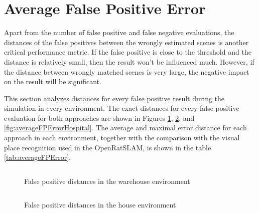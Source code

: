 \section{Average False Positive Error}\label{section:averageError}

Apart from the number of false positive and false negative evaluations, the distances of the false positives between the wrongly estimated scenes is another critical performance metric. If the false positive is close to the threshold and the distance is relatively small, then the result won't be influenced much. However, if the distance between wrongly matched scenes is very large, the negative impact on the result will be significant.\par
This section analyzes distances for every false positive result during the simulation in every environment. The exact distances for every false positive evaluation for both approaches are shown in Figures \ref{fig:averageFPErrorWarehouse}, \ref{fig:averageFPErrorHouse}, and \ref{fig:averageFPErrorHospital}. The average and maximal error distance for each approach in each environment, together with the comparison with the visual place recognition used in the OpenRatSLAM, is shown in the table \ref{tab:averageFPError}.\par

\begin{figure}[!tbp]
    \centering
    ${}$\\
    ${}$\\
    ${}$\\
    ${}$\\
    \hfill
    ${}$\\
    \caption{False positive distances in the warehouse environment}
    \label{fig:averageFPErrorWarehouse}
\end{figure}

\begin{figure}[!tbp]
    \centering
    ${}$\\
    ${}$\\
    ${}$\\
    ${}$\\
    ${}$\\
    \hfill
    ${}$\\
    \caption{False positive distances in the house environment}
    \label{fig:averageFPErrorHouse}
\end{figure}

